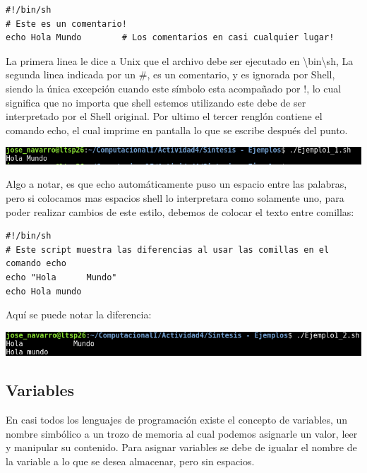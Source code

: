 \documentclass[12pt]{article}
\begin{document}
\begin{verbatim}
#!/bin/sh
# Este es un comentario!
echo Hola Mundo        # Los comentarios en casi cualquier lugar!
\end{verbatim}

La primera linea le dice a Unix que el archivo debe ser ejecutado en 
\textbackslash bin\textbackslash sh, La segunda linea indicada por un \#, es un comentario, y es ignorada por Shell, siendo la única excepción cuando este símbolo esta acompañado por !, lo cual significa que no importa que shell estemos utilizando este debe de ser interpretado por el Shell original. Por ultimo el tercer renglón contiene el comando echo, el cual imprime en pantalla lo que se escribe después del punto. \\

\begin{center}
\includegraphics[scale=0.55]{Ej1_1.png}
\end{center} 

Algo a notar, es que echo automáticamente puso un espacio entre las palabras, pero si colocamos mas espacios shell lo interpretara como solamente uno, para poder realizar cambios de este estilo, debemos de colocar el texto entre comillas:

\begin{verbatim}
#!/bin/sh
# Este script muestra las diferencias al usar las comillas en el comando echo
echo "Hola 		Mundo"
echo Hola mundo
\end{verbatim}

Aquí se puede notar la diferencia: 

\begin{center}
\includegraphics[scale=0.55]{Ej1_2.png}
\end{center} 

\subsection{Variables}
En casi todos los lenguajes de programación existe el concepto de variables, un nombre simbólico a un trozo de memoria al cual podemos asignarle un valor, leer y manipular su contenido. Para asignar variables se debe de igualar el nombre de la variable a lo que se desea almacenar, pero sin espacios. \\
\end{document}
